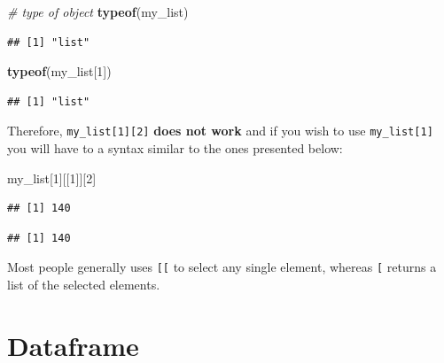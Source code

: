 \documentclass[12pt,]{krantz}
\newenvironment{Shaded}{\begin{snugshade}}{\end{snugshade}}
\newcommand{\KeywordTok}[1]{\textcolor[rgb]{0.27,0.27,0.27}{\textbf{#1}}}
\newcommand{\DecValTok}[1]{\textcolor[rgb]{0.06,0.06,0.06}{#1}}
\newcommand{\CommentTok}[1]{\textcolor[rgb]{0.37,0.37,0.37}{\textit{#1}}}
\newcommand{\OperatorTok}[1]{\textcolor[rgb]{0.43,0.43,0.43}{\textbf{#1}}}
\newcommand{\NormalTok}[1]{#1}
\begin{document}
\begin{Shaded}
\begin{Highlighting}[]
\CommentTok{# type of object }
\KeywordTok{typeof}\NormalTok{(my_list)}
\end{Highlighting}
\end{Shaded}

\begin{verbatim}
## [1] "list"
\end{verbatim}

\begin{Shaded}
\begin{Highlighting}[]
\KeywordTok{typeof}\NormalTok{(my_list[}\DecValTok{1}\NormalTok{])}
\end{Highlighting}
\end{Shaded}

\begin{verbatim}
## [1] "list"
\end{verbatim}

Therefore, \texttt{my\_list{[}1{]}{[}2{]}} \textbf{does not work} and if
you wish to use \texttt{my\_list{[}1{]}} you will have to a syntax
similar to the ones presented below:

\begin{Shaded}
\begin{Highlighting}[]
\NormalTok{my_list[}\DecValTok{1}\NormalTok{][[}\DecValTok{1}\NormalTok{]][}\DecValTok{2}\NormalTok{]}
\end{Highlighting}
\end{Shaded}

\begin{verbatim}
## [1] 140
\end{verbatim}

\begin{Shaded}
\end{Shaded}

\begin{verbatim}
## [1] 140
\end{verbatim}

Most people generally uses \texttt{{[}{[}} to select any single element,
whereas \texttt{{[}} returns a list of the selected elements.

\section{Dataframe}\label{dataframe}
\end{document}
